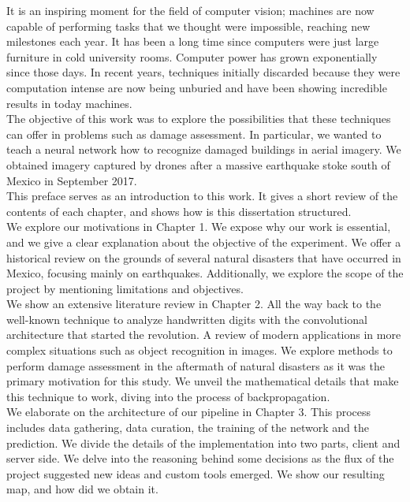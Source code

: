 It is an inspiring moment for the field of computer vision; machines are now capable of performing tasks that we thought were impossible, reaching new milestones each year. It has been a long time since computers were just large furniture in cold university rooms. Computer power has grown exponentially since those days. In recent years, techniques initially discarded because they were computation intense are now being unburied and have been showing incredible results in today machines.\\

The objective of this work was to explore the possibilities that these techniques can offer in problems such as damage assessment. In particular, we wanted to teach a neural network how to recognize damaged buildings in aerial imagery. We obtained imagery captured by drones after a massive earthquake stoke south of Mexico in September 2017.\\

This preface serves as an introduction to this work. It gives a short review of the contents of each chapter, and shows how is this dissertation structured.\\

We explore our motivations in Chapter 1. We expose why our work is essential, and we give a clear explanation about the objective of the experiment. We offer a historical review on the grounds of several natural disasters that have occurred in Mexico, focusing mainly on earthquakes. Additionally, we explore the scope of the project by mentioning limitations and objectives.\\

We show an extensive literature review in Chapter 2. All the way back to the well-known technique to analyze handwritten digits with the convolutional architecture that started the revolution. A review of modern applications in more complex situations such as object recognition in images. We explore methods to perform damage assessment in the aftermath of natural disasters as it was the primary motivation for this study. We unveil the mathematical details that make this technique to work, diving into the process of backpropagation.\\

We elaborate on the architecture of our pipeline in Chapter 3. This process includes data gathering, data curation, the training of the network and the prediction. We divide the details of the implementation into two parts, client and server side. We delve into the reasoning behind some decisions as the flux of the project suggested new ideas and custom tools emerged. We show our resulting map, and how did we obtain it.\\

